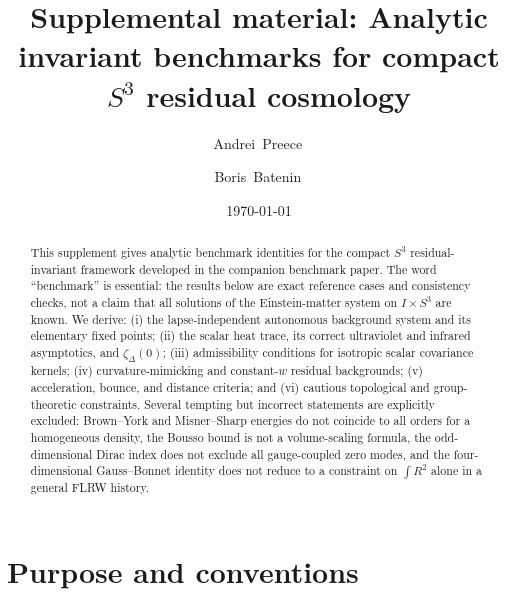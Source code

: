 \documentclass[
  aps,
  prd,
  reprint,
  superscriptaddress,
  nofootinbib,
  floatfix,
  longbibliography
]{revtex4-2}
\begin{document}
\title{Supplemental material: Analytic invariant benchmarks for compact \texorpdfstring{\(S^3\)}{S3} residual cosmology}

\author{Andrei~Preece\,}

\author{Boris~Batenin\,}

\date{\today}

\begin{abstract}
This supplement gives analytic benchmark identities for the compact \(S^3\)
residual-invariant framework developed in the companion benchmark paper.  The word
``benchmark'' is essential: the results
below are exact reference cases and consistency checks, not a claim that all
solutions of the Einstein-matter system on \(I\times S^3\) are known.  We derive:
(i) the lapse-independent autonomous background system and its elementary fixed
points; (ii) the scalar heat trace, its correct ultraviolet and infrared
asymptotics, and \(\zeta_\Delta(0)\); (iii) admissibility conditions for isotropic
scalar covariance kernels; (iv) curvature-mimicking and constant-\(w\) residual
backgrounds; (v) acceleration, bounce, and distance criteria; and (vi) cautious
topological and group-theoretic constraints.  Several tempting but incorrect
statements are explicitly excluded: Brown--York and Misner--Sharp energies do not
coincide to all orders for a homogeneous density, the Bousso bound is not a
volume-scaling formula, the odd-dimensional Dirac index does not exclude all
gauge-coupled zero modes, and the four-dimensional Gauss--Bonnet identity does not
reduce to a constraint on \(\int R^2\) alone in a general FLRW history.
\end{abstract}

\maketitle

\section{Purpose and conventions}
\label{sec:purpose}
\end{document}
